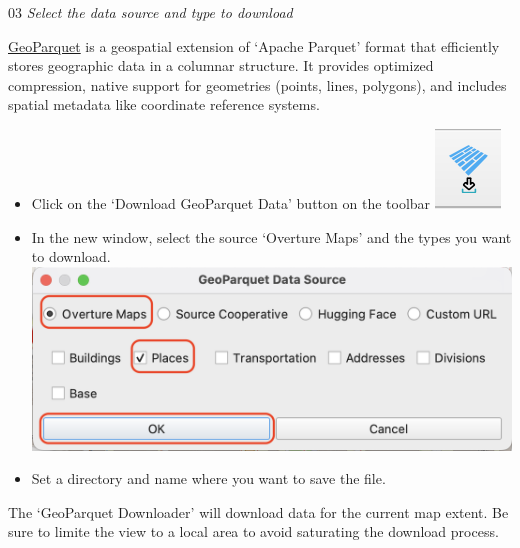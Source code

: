 \documentclass[
  letterpaper,
  DIV=11,
  numbers=noendperiod]{scrartcl}
\providecommand{\tightlist}{%
  \setlength{\itemsep}{0pt}\setlength{\parskip}{0pt}}\usepackage{longtable,booktabs,array}
\begin{document}
{03} \emph{Select the data source and type to download}

\begin{tcolorbox}[enhanced jigsaw, opacitybacktitle=0.6, colframe=quarto-callout-note-color-frame, arc=.35mm, leftrule=.75mm, toptitle=1mm, opacityback=0, titlerule=0mm, breakable, colback=white, colbacktitle=quarto-callout-note-color!10!white, toprule=.15mm, bottomtitle=1mm, coltitle=black, title=\textcolor{quarto-callout-note-color}{\faInfo}\hspace{0.5em}{Note}, left=2mm, rightrule=.15mm, bottomrule=.15mm]

\href{https://geoparquet.org/}{GeoParquet} is a geospatial extension of
`Apache Parquet' format that efficiently stores geographic data in a
columnar structure. It provides optimized compression, native support
for geometries (points, lines, polygons), and includes spatial metadata
like coordinate reference systems.

\end{tcolorbox}

\begin{itemize}
\tightlist
\item
  Click on the `Download GeoParquet Data' button on the toolbar
  \includegraphics[width=0.04\linewidth,height=\textheight,keepaspectratio]{./images/geop_but.png}
\item
  In the new window, select the source `Overture Maps' and the types you
  want to download.
  \includegraphics[width=0.5\linewidth,height=\textheight,keepaspectratio]{./images/geop_source.png}
\item
  Set a directory and name where you want to save the file.
\end{itemize}

\begin{tcolorbox}[enhanced jigsaw, opacitybacktitle=0.6, colframe=quarto-callout-warning-color-frame, arc=.35mm, leftrule=.75mm, toptitle=1mm, opacityback=0, titlerule=0mm, breakable, colback=white, colbacktitle=quarto-callout-warning-color!10!white, toprule=.15mm, bottomtitle=1mm, coltitle=black, title=\textcolor{quarto-callout-warning-color}{\faExclamationTriangle}\hspace{0.5em}{Warning!}, left=2mm, rightrule=.15mm, bottomrule=.15mm]

The `GeoParquet Downloader' will download data for the current map
extent. Be sure to limite the view to a local area to avoid saturating
the download process.

\end{tcolorbox}
\end{document}
